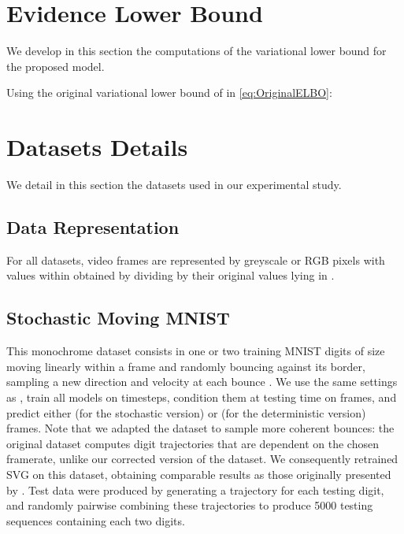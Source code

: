 \documentclass{article}
\begin{document}
\appendix


\section{Evidence Lower Bound}
\label{app:ELBO}

We develop in this section the computations of the variational lower bound for the proposed model.

Using the original variational lower bound of \citet{Kingma2014} in \cref{eq:OriginalELBO}:
\begingroup
\allowdisplaybreaks

\endgroup


\section{Datasets Details}
\label{app:Dataset}

We detail in this section the datasets used in our experimental study.

\subsection{Data Representation}

For all datasets, video frames are represented by greyscale or RGB pixels with values within  obtained by dividing by  their original values lying in .

\subsection{Stochastic Moving MNIST}
\label{app:Dataset-SMMNIST}

This monochrome dataset consists in one or two training MNIST digits \citep{LeCun1998} of size  moving linearly within a  frame and randomly bouncing against its border, sampling a new direction and velocity at each bounce \citep{Denton2018}.
We use the same settings as \citet{Denton2018}, train all models on  timesteps, condition them at testing time on  frames, and predict either  (for the stochastic version) or  (for the deterministic version) frames.
Note that we adapted the dataset to sample more coherent bounces: the original dataset computes digit trajectories that are dependent on the chosen framerate, unlike our corrected version of the dataset.
We consequently retrained SVG on this dataset, obtaining comparable results as those originally presented by \citet{Denton2018}.
Test data were produced by generating a trajectory for each testing digit, and randomly pairwise combining these trajectories to produce \num{5000} testing sequences containing each two digits.
\end{document}
